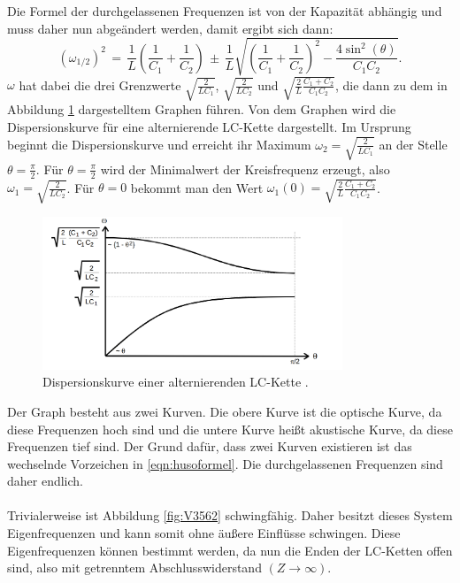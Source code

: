 \documentclass[
  bibliography=totoc,     %
  captions=tableheading,  %
  titlepage=firstiscover, %
]{scrartcl}
\begin{document}
Die Formel der durchgelassenen Frequenzen ist von der Kapazität abhängig und muss
daher nun abgeändert werden, damit ergibt sich dann:
\begin{equation}
  (\omega_{1/2})^2\,=\,\frac{1}{L}\left(\frac{1}{C_1}+\frac{1}{C_2}\right)\,\pm\,\frac{1}{L}\sqrt{\left(\frac{1}{C_1}+\frac{1}{C_2}\right)^2-\frac{4\sin^2(\theta)}{C_1C_2}}.
  \label{eqn:husoformel}
\end{equation}
$\omega$ hat dabei die drei Grenzwerte $\sqrt{\frac{2}{LC_1}}$,
$\sqrt{\frac{2}{LC_2}}$ und $\sqrt{\frac{2}{L}\frac{C_1+C_2}{C_1C_2}}$, die
dann zu dem in Abbildung \ref{fig:V3564} dargestelltem Graphen führen. Von dem
Graphen wird die Dispersionskurve für eine alternierende LC-Kette dargestellt.
Im Ursprung beginnt die Dispersionskurve und erreicht ihr Maximum
$\omega_2=\sqrt{\frac{2}{LC_1}}$ an der Stelle $\theta=\frac{\pi}{2}$.
Für $\theta=\frac{\pi}{2}$ wird der Minimalwert der Kreisfrequenz erzeugt,
also $\omega_1=\sqrt{\frac{2}{LC_2}}$.
Für $\theta=0$ bekommt man den Wert $\omega_1(0)=\sqrt{\frac{2}{L}\frac{C_1+C_2}{C_1C_2}}$.
\begin{figure}[htb]
  \centering
  \includegraphics[width=0.8\textwidth]{V3564.png}
  \caption{Dispersionskurve einer alternierenden LC-Kette \cite{anleitung}.}
  \label{fig:V3564}
\end{figure}
Der Graph besteht aus zwei Kurven. Die obere Kurve ist die optische Kurve, da
diese Frequenzen hoch sind und die untere Kurve heißt akustische Kurve, da diese
Frequenzen tief sind. Der Grund dafür, dass zwei Kurven existieren ist das
wechselnde Vorzeichen in \eqref{eqn:husoformel}. Die durchgelassenen Frequenzen
sind daher endlich.\\
\\
Trivialerweise ist Abbildung \ref{fig:V3562} schwingfähig. Daher besitzt dieses System
Eigenfrequenzen und kann somit ohne äußere Einflüsse schwingen. Diese
Eigenfrequenzen können bestimmt werden, da nun die Enden der LC-Ketten offen
sind, also mit getrenntem Abschlusswiderstand $\left( Z \to \infty \right)$.
\end{document}
